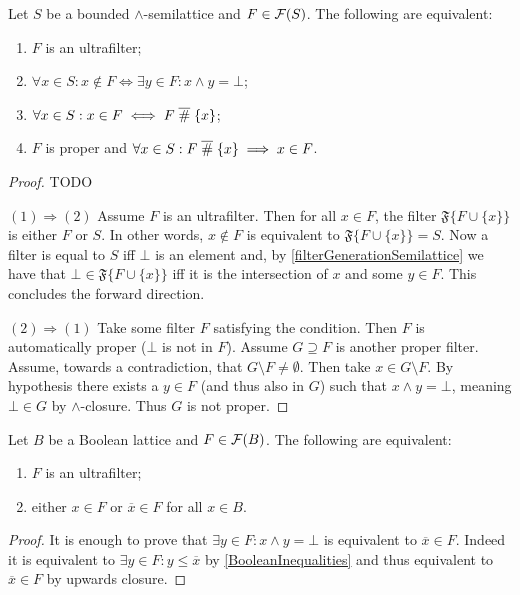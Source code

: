 \begin{proposition} \label{ultrafilterCriteria}
Let $S$ be a bounded $\wedge$-semilattice and $F\in \operatorname{\mathcal{F}}(S)$. The following are equivalent:
\begin{enumerate}
\item $F$ is an ultrafilter;
\item $\forall x\in S: x\notin F \iff \exists y\in F: x\wedge y = \bot$;
\item $\forall x\in S: x\in F \iff F\mathrel{\overline{\#}} \{x\}$;
\item $F$ is proper and $\forall x\in S: F\mathrel{\overline{\#}} \{x\} \implies x\in F$.
\end{enumerate}
\end{proposition}
\begin{proof}
TODO

$(1)\Rightarrow (2)$ Assume $F$ is an ultrafilter. Then for all $x\in F$, the filter $\mathfrak{F}\big\{F\cup \{x\}\big\}$ is either $F$ or $S$. In other words, $x\notin F$ is equivalent to $\mathfrak{F}\big\{F\cup \{x\}\big\} = S$. Now a filter is equal to $S$ iff $\bot$ is an element and, by \ref{filterGenerationSemilattice} we have that $\bot \in \mathfrak{F}\big\{F\cup \{x\}\big\}$ iff it is the intersection of $x$ and some $y\in F$. This concludes the forward direction.

$(2)\Rightarrow (1)$ Take some filter $F$ satisfying the condition. Then $F$ is automatically proper ($\bot$ is not in $F$). Assume $G\supseteq F$ is another proper filter. Assume, towards a contradiction, that $G\setminus F \neq \emptyset$. Then take $x\in G\setminus F$. By hypothesis there exists a $y\in F$ (and thus also in $G$) such that $x\wedge y = \bot$, meaning $\bot \in G$ by $\wedge$-closure. Thus $G$ is not proper.
\end{proof}
\begin{corollary}
Let $B$ be a Boolean lattice and $F\in \operatorname{\mathcal{F}}(B)$. The following are equivalent:
\begin{enumerate}
\item $F$ is an ultrafilter;
\item either $x\in F$ or $\overline{x}\in F$ for all $x\in B$.
\end{enumerate}
\end{corollary}
\begin{proof}
It is enough to prove that $\exists y\in F: x\wedge y = \bot$ is equivalent to $\overline{x}\in F$. Indeed it is equivalent to $\exists y\in F: y \leq \overline{x}$ by \ref{BooleanInequalities} and thus equivalent to $\overline{x}\in F$ by upwards closure.
\end{proof}

